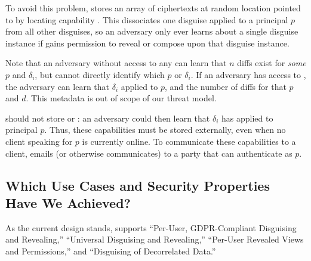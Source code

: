 To avoid this problem, \sys stores 
an array of  ciphertexts at random location pointed to by locating capability
.  This dissociates one disguise applied to a principal $p$ from all other
disguises, so an adversary only ever learns about a single disguise instance if \sys gains
permission to reveal or compose upon that disguise instance.

Note that an adversary without access to any  can learn that $n$ diffs exist for
\emph{some} $p$ and $\delta_i$, but cannot directly identify which $p$ or $\delta_i$.
If an adversary has access to , the adversary can learn that $\delta_i$
applied to $p$, and the number of  diffs for that $p$ and $d$. This metadata is out of scope of our threat model.

\sys should not store  or : an adversary could then
learn that $\delta_i$ has applied to principal $p$. Thus, these capabilities must be stored externally,
even when no client speaking for $p$ is currently online.
%
%
To communicate these capabilities to a client,
\sys emails (or otherwise communicates)  to a party that can authenticate as $p$. 

\subsection{Which Use Cases and Security Properties Have We Achieved?}
As the current design stands, \sys supports ``Per-User, GDPR-Compliant Disguising and
Revealing,'' ``Universal Disguising and Revealing,'' ``Per-User Revealed Views and
Permissions,'' and ``Disguising of Decorrelated Data.''

